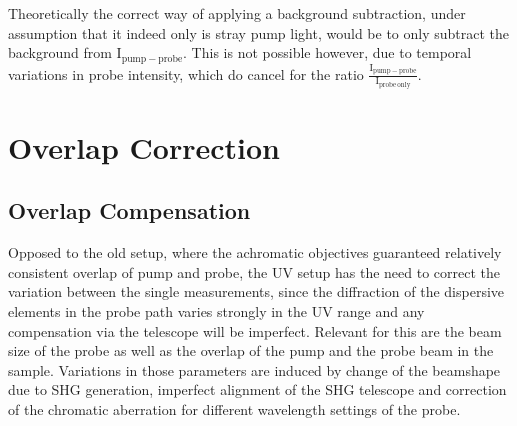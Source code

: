 \documentclass[twoside,openright]{scrreprt}
\begin{document}
Theoretically the correct way of applying a background subtraction, under assumption that it indeed only is stray pump light, would be to only subtract the background from $\mathrm{I_{pump-probe}}$. This is not possible however, due to temporal variations in probe intensity, which do cancel for the ratio $\mathrm{\frac{I_{pump-probe}}{I_{probe\, only}}}$.



\chapter{Overlap Correction}\label{chp:OverlapCorrection}
\section{Overlap Compensation}
Opposed to the old setup, where the achromatic objectives guaranteed relatively consistent overlap of pump and probe, the UV setup has the need to correct the variation between the single measurements, since the diffraction of the dispersive elements in the probe path varies strongly in the UV range and any compensation via the telescope will be imperfect.\newline
Relevant for this are the beam size of the probe as well as the overlap of the pump and the probe beam in the sample. Variations in those parameters are induced by change of the beamshape due to SHG generation, imperfect alignment of the SHG telescope and correction of the chromatic aberration for different wavelength settings of the probe.\newline
\end{document}
